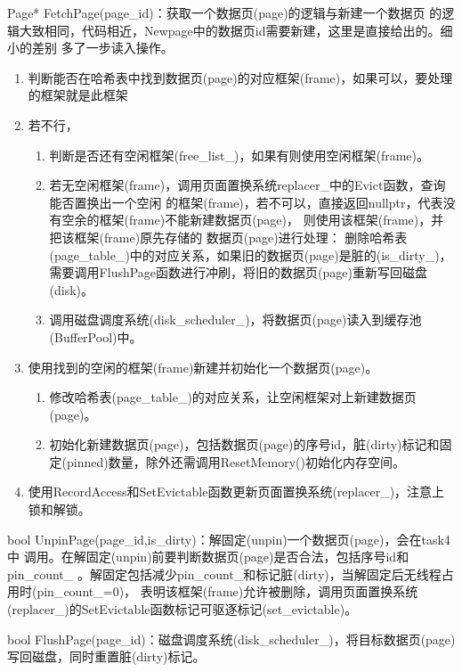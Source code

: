\documentclass[a4paper]{article}
\begin{document}
Page* FetchPage(page\_id)：获取一个数据页(page)的逻辑与新建一个数据页
的逻辑大致相同，代码相近，Newpage中的数据页id需要新建，这里是直接给出的。细小的差别
多了一步读入操作。

\begin{enumerate}
   \item 判断能否在哈希表中找到数据页(page)的对应框架(frame)，如果可以，要处理的框架就是此框架
   \item 若不行，
   \begin{enumerate}
      \item 判断是否还有空闲框架(free\_list\_)，如果有则使用空闲框架(frame)。
      \item 若无空闲框架(frame)，调用页面置换系统replacer\_中的Evict函数，查询能否置换出一个空闲
      的框架(frame)，若不可以，直接返回nullptr，代表没有空余的框架(frame)不能新建数据页(page)，
      则使用该框架(frame)，并把该框架(frame)原先存储的 数据页(page)进行处理：
      删除哈希表(page\_table\_)中的对应关系，如果旧的数据页(page)是脏的(is\_dirty\_)，
      需要调用FlushPage函数进行冲刷，将旧的数据页(page)重新写回磁盘(disk)。
      \item 调用磁盘调度系统(disk\_scheduler\_)，将数据页(page)读入到缓存池(BufferPool)中。
   \end{enumerate}
   \item 使用找到的空闲的框架(frame)新建并初始化一个数据页(page)。
   \begin{enumerate}
      \item 修改哈希表(page\_table\_)的对应关系，让空闲框架对上新建数据页(page)。
      \item 初始化新建数据页(page)，包括数据页(page)的序号id，脏(dirty)标记和固定(pinned)数量，除外还需调用ResetMemory()初始化内存空间。
   \end{enumerate}
   \item 使用RecordAccess和SetEvictable函数更新页面置换系统(replacer\_)，注意上锁和解锁。
\end{enumerate}

bool UnpinPage(page\_id,is\_dirty)：解固定(unpin)一个数据页(page)，会在task4中
调用。在解固定(unpin)前要判断数据页(page)是否合法，包括序号id和pin\_count\_
。解固定包括减少pin\_count\_和标记脏(dirty)，当解固定后无线程占用时(pin\_count\_=0)，
表明该框架(frame)允许被删除，调用页面置换系统(replacer\_)的SetEvictable函数标记可驱逐标记(set\_evictable)。

bool FlushPage(page\_id)：磁盘调度系统(disk\_scheduler\_)，将目标数据页(page)
写回磁盘，同时重置脏(dirty)标记。
\end{document}
